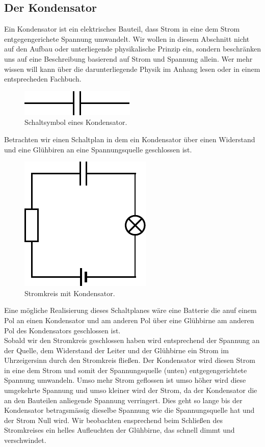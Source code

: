 \documentclass[11pt,a4paper,leqno]{report}
\numberwithin{equation}{chapter}
\begin{document}
\subsection{Der Kondensator}
 Ein Kondensator ist ein elektrisches Bauteil, dass Strom in eine dem Strom entgegengerichete Spannung umwandelt. Wir wollen in diesem Abschnitt nicht auf den Aufbau oder unterliegende physikalische Prinzip ein, sondern beschr\"anken uns auf eine Beschreibung basierend auf Strom und Spannung allein. Wer mehr wissen will kann \"uber die darunterliegende Physik im Anhang lesen oder in einem entsprecheden Fachbuch.
  \begin{figure}[H]
 	\begin{center}
 		\includegraphics[scale=0.8]{Bilder/kondens.pdf}
 		\caption{Schaltsymbol eines Kondensator.}
 	\end{center}
 \end{figure}
 \noindent
 Betrachten wir einen Schaltplan in dem ein Kondensator \"uber einen Widerstand und eine Gl\"uhbiren an eine Spannungsquelle geschlossen ist. 
 \begin{figure}[H]
 	\begin{center}
 		\includegraphics[scale=0.8]{Bilder/kondensator.pdf}
 		\caption{Stromkreis mit Kondensator.}
 	\end{center}
 \end{figure}
 \noindent
 Eine m\"ogliche Realisierung dieses Schaltplanes w\"are eine Batterie die anuf einem Pol an einen Kondensator und am anderen Pol \"uber eine Gl\"uhbirne am anderen Pol des Kondensators geschlossen ist.\\
 Sobald wir den Stromkreis geschlossen haben wird entsprechend der Spannung an der Quelle, dem Widerstand der Leiter und der Gl\"uhbirne ein Strom im Uhrzeigersinn durch den Stromkreis flie\ss{}en. Der Kondensator wird diesen Strom in eine dem Strom und somit der Spannungsquelle (unten) entgegengerichtete Spannung umwandeln. Umso mehr Strom geflossen ist umso h\"oher wird diese umgekehrte Spannung und umso kleiner wird der Strom, da der Kondensator die an den Bauteilen anliegende Spannung verringert. Dies geht so lange bis der Kondensator betragsm\"assig dieselbe Spannung wie die Spannungsquelle hat und der Strom Null wird. Wir beobachten ensprechend beim Schlie\ss{}en des Stromkreises ein helles Aufleuchten der Gl\"uhbirne, das schnell dimmt und verschwindet.\\
\end{document}
